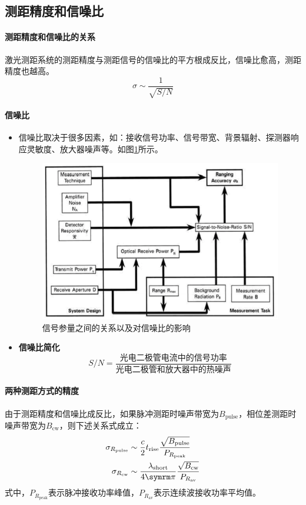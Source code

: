 \subsection{测距精度和信噪比} %
\paragraph{测距精度和信噪比的关系}激光测距系统的测距精度与测距信号的信噪比的平方根成反比，信噪比愈高，测距精度也越高。
\begin{equation}
\sigma \sim \dfrac{1}{\sqrt{S/N}}
\end{equation}

\paragraph{信噪比} 
\begin{itemize}
	\item 信噪比取决于很多因素，如：接收信号功率、信号带宽、背景辐射、探测器响应灵敏度、放大器噪声等。如图\ref{fig:信号参量之间的关系以及对信噪比的影响}所示。
		\begin{figure}
			\centering
			\includegraphics[width=0.7\linewidth]{figure/Chapter3/信号参量之间的关系以及对信噪比的影响}
			\caption{信号参量之间的关系以及对信噪比的影响}
			\label{fig:信号参量之间的关系以及对信噪比的影响}
		\end{figure}
	\item \textbf{信噪比简化}
		\begin{equation}
		S/N = \dfrac{\text{光电二极管电流中的信号功率}}{\text{光电二极管和放大器中的热噪声}}
		\end{equation}
\end{itemize}

\paragraph{两种测距方式的精度}
由于测距精度和信噪比成反比，如果脉冲测距时噪声带宽为$ B_{\text{pulse}} $，相位差测距时噪声带宽为$ B_{\text{cw}} $，则下述关系式成立：
\begin{align}
\sigma_{R_{\text{pulse}}} & \sim \dfrac{c}{2}t_{\text{rise}}\dfrac{\sqrt{B_{\text{pulse}}}}{P_{R_{\text{peak}}}} \\
\sigma_{R_{\text{cw}}} & \sim \dfrac{\lambda_{\text{short}}}{4\cpi}\dfrac{\sqrt{B_{\text{cw}}}}{P_{R_{\text{av}}}}
\end{align}
式中，$ P_{R_{\text{peak}}} $表示脉冲接收功率峰值，$ P_{R_{\text{av}}} $表示连续波接收功率平均值。

